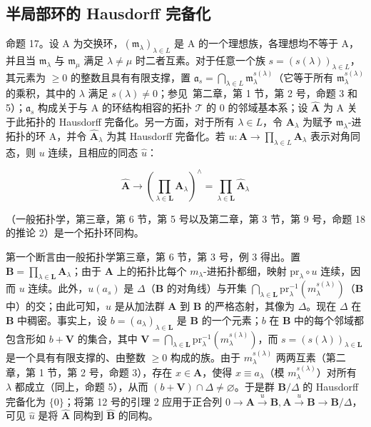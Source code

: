 \subsection{半局部环的 Hausdorff 完备化}

命题 17。设 A 为交换环，\((\mathfrak{m}_{\lambda})_{\lambda \in L}\) 是 A 的一个理想族，各理想均不等于 A，并且当 \(\mathfrak{m}_{\lambda}\) 与 \(\mathfrak{m}_{\mu}\) 满足 \(\lambda \neq \mu\) 时二者互素。对于任意一个族 \(s = (s(\lambda))_{\lambda \in L}\)，其元素为 \(\geqslant 0\) 的整数且具有有限支撑，置 \(\mathfrak{a}_{s} = \bigcap_{\lambda \in L} \mathfrak{m}_{\lambda}^{s(\lambda)}\)（它等于所有 \(\mathfrak{m}_{\lambda}^{s(\lambda)}\) 的乘积，其中的 \(\lambda\) 满足 \(s(\lambda) \neq 0\)；参见~第二章，第 1 节，第 2 号，命题 3 和 5）；\(\mathfrak{a}_{s}\) 构成关于与 A 的环结构相容的拓扑 \(\mathcal{T}\) 的 0 的邻域基本系；设 \(\hat{\mathbf{A}}\) 为 A 关于此拓扑的 Hausdorff 完备化。另一方面，对于所有 \(\lambda \in L\)，令 \(\mathbf{A}_{\lambda}\) 为赋予 \(\mathfrak{m}_{\lambda}\)-进拓扑的环 A，并令 \(\hat{\mathbf{A}}_{\lambda}\) 为其 Hausdorff 完备化。若 \(u: \mathbf{A} \to \prod_{\lambda \in L} \mathbf{A}_{\lambda}\) 表示对角同态，则 \(u\) 连续，且相应的同态 \(\hat{u}\)：

\[
\hat {\mathbf {A}} \rightarrow \left(\prod_ {\lambda \in \mathbf {L}} \mathbf {A} _ {\lambda}\right) ^ {\wedge} = \prod_ {\lambda \in \mathbf {L}} \hat {\mathbf {A}} _ {\lambda}
\]

（一般拓扑学，第三章，第 6 节，第 5 号以及第二章，第 3 节，第 9 号，命题 18 的推论 2）是一个拓扑环同构。

第一个断言由一般拓扑学第三章，第 6 节，第 3 号，例 3 得出。置 \(\mathbf{B} = \prod_{\lambda \in \mathbf{L}} \mathbf{A}_{\lambda}\)；由于 \(\mathbf{A}\) 上的拓扑比每个 \(m_{\lambda}\)-进拓扑都细，映射 \(\mathrm{pr}_{\lambda} \circ u\) 连续，因而 \(u\) 连续。此外，\(u(a_s)\) 是 \(\Delta\)（\(\mathbf{B}\) 的对角线）与开集 \(\bigcap_{\lambda \in \mathbf{L}} \mathrm{pr}_{\lambda}^{-1}(m_{\lambda}^{s(\lambda)})\)（\(\mathbf{B}\) 中）的交；由此可知，\(u\) 是从加法群 \(\mathbf{A}\) 到 \(\mathbf{B}\) 的严格态射，其像为 \(\Delta\)。现在 \(\Delta\) 在 \(\mathbf{B}\) 中稠密。事实上，设 \(b = (a_{\lambda})_{\lambda \in \mathbf{L}}\) 是 \(\mathbf{B}\) 的一个元素；\(b\) 在 \(\mathbf{B}\) 中的每个邻域都包含形如 \(b + \mathbf{V}\) 的集合，其中 \(\mathbf{V} = \bigcap_{\lambda \in \mathbf{L}} \mathrm{pr}_{\lambda}^{-1}(m_{\lambda}^{s(\lambda)})\)，而 \(s = (s(\lambda))_{\lambda \in \mathbf{L}}\) 是一个具有有限支撑的、由整数 \(\geqslant 0\) 构成的族。由于 \(m_{\lambda}^{s(\lambda)}\) 两两互素（第二章，第 1 节，第 2 号，命题 3），存在 \(x \in \mathbf{A}\)，使得 \(x \equiv a_{\lambda}\)（模 \(m_{\lambda}^{s(\lambda)}\)）对所有 \(\lambda\) 都成立（同上，命题 5），从而 \((b + \mathbf{V}) \cap \Delta \neq \varnothing\)。于是群 \(\mathbf{B}/\Delta\) 的 Hausdorff 完备化为 \(\{0\}\)；将第 12 号的引理 2 应用于正合列 \(0 \to \mathbf{A} \xrightarrow{u} \mathbf{B}, \mathbf{A} \xrightarrow{u} \mathbf{B} \to \mathbf{B}/\Delta\)，可见 \(\hat{u}\) 是将 \(\hat{\mathbf{A}}\) 同构到 \(\hat{\mathbf{B}}\) 的同构。

